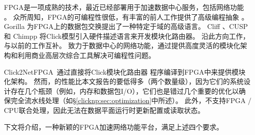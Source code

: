 FPGA是一项成熟的技术，最近已经部署用于加速数据中心服务，包括网络功能 \cite {putnam2014reconfigurable,smartnic,rubow2010chimpp,lavasani2012compiling}。
众所周知，FPGA的可编程性很低，有丰富的前人工作提供了高级编程抽象 \cite {bluespec,auerbach2010lime,bacon2013fpga,singh2011implementing,bachrach2012chisel,wester2015transformation}。
Gorilla \cite {lavasani2012compiling} 为FPGA上的数据包交换提出了一种特定于域的高级语言。
Cliff \cite{kulkarni2004mapping}、CUSP \cite{schelle2005cusp} 和 Chimpp \cite {rubow2010chimpp} 将Click模型引入硬件描述语言来开发模块化路由器。
\name 沿此方向工作，与以前的工作互补。
\name 致力于数据中心的网络功能，通过提供高度灵活的模块化架构和利用商业高层次综合工具解决可编程性问题。

Click2NetFPGA~\cite {Click2NetFPGA}通过直接将Click模块化路由器 \cite {kohler2000click}程序编译到FPGA中来提供模块化架构。
然而，\cite {Click2NetFPGA}的性能比本文报告的要低得多（两个数量级），因为它们的系统设计存在几个瓶颈（例如，内存和数据包I/O），它们也是错过几个重要的优化以确保完全流水线处理（如\S \ref {clicknp:sec:optimization}中所述）。
此外，\cite {Click2NetFPGA}不支持FPGA / CPU联合处理，因此无法在数据平面运行时更新配置或读取状态。



下文将介绍\name{}，一种新颖的FPGA加速网络功能平台，满足上述四个要求。

